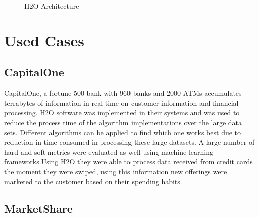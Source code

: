 \documentclass[9pt,twocolumn,twoside]{../../styles/osajnl}
\begin{document}
\begin{figure}[htbp]
\centering
{}
\caption{H2O Architecture\cite{www-h2o-architecture}}
\label{ fig:Architecture of H2O}
\end{figure}


\section {Used Cases}

\subsection {CapitalOne}

CapitalOne, a fortune 500 bank with 960 banks and 2000 ATMs
accumulates terrabytes of information in real time on customer
information and financial processing. H2O software was implemented in their systems and  was used to reduce the
process time of the algorithm implementations over the large data sets\cite{www-h2o-capitalone}. Different algorithms can be applied to find which one
works best due to reduction in time consumed in processing these large
datasets. A large number of hard and soft metrics were evaluated as
well using machine learning frameworks\cite{www-h2o-capitalone}.Using H2O they were able to process data received from credit cards the moment they were swiped, using this information new offerings were marketed to the customer based on their spending habits.

\subsection {MarketShare}
\end{document}
